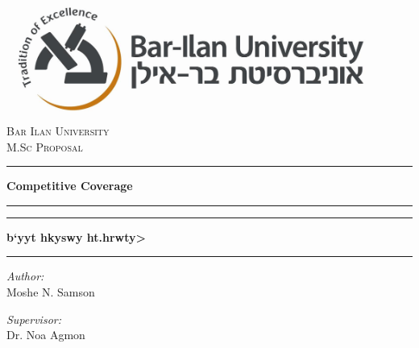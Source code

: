 \documentclass[a4paper,english,10pt]{article}
\begin{document}
\begin{titlepage}
\begin{center}


\includegraphics[width=0.9\textwidth]{Images/logo.jpg}\\[1cm]
\textsc{\LARGE Bar Ilan University}\\[1.5cm]
\textsc{\Large M.Sc Proposal}\\[0.5cm]

\hrule
{ \vspace{2 mm} }
{ \huge \bfseries Competitive Coverage}
{ \vspace{3 mm} }
\hrule
{ \vspace{8 mm} }

\hrule
{ \vspace{2 mm} }

{ \huge \bfseries  \huge \bfseries \<b`yyt hkyswy ht.hrwty> }
{ \vspace{3 mm} }
\hrule
{ \vspace{8 mm} }


\begin{minipage}{0.4\textwidth}
\begin{flushleft} \large
\emph{Author:}\\
Moshe N. Samson 

\end{flushleft}
\end{minipage}
\begin{minipage}{0.4\textwidth}
\begin{flushleft} \large
\emph{Supervisor:} \\
Dr. Noa Agmon
\end{flushleft}
\end{minipage}



\end{center}
\end{titlepage}
\end{document}
